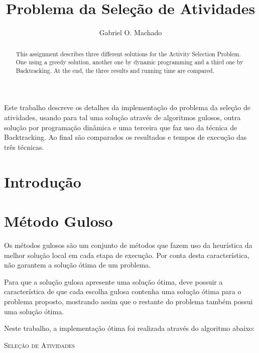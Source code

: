 \documentclass[12pt]{article}
\title{Problema da Seleção de Atividades}
\author{Gabriel O. Machado\inst{1} }
\begin{document}
 

\maketitle

\begin{abstract}
	This assignment describes three different solutions for the Activity Selection Problem. One using a greedy solution, 
	another one by dynamic programming and a third one by Backtracking.
	At the end, the three results and running time are compared.
\end{abstract}
     
\begin{resumo} 
	Este trabalho descreve os detalhes da implementação do problema da seleção de atividades, 
	usando para tal uma solução através de algoritmos gulosos, outra solução por programação dinâmica
	e uma terceira que faz uso da técnica de Backtracking.
	Ao final são comparados os resultados e tempos de execução das três técnicas.
	
\end{resumo}


\section{Introdução}



\section{Método Guloso} \label{sec:guloso}

Os métodos gulosos são um conjunto de métodos que fazem uso da heurística da melhor solução local em cada etapa de execução. Por conta desta característica, não garantem a solução ótima de um problema.

Para que a solução gulosa apresente uma solução ótima, deve possuir a característica de que cada escolha gulosa contenha uma solução ótima para o problema proposto, mostrando assim que o restante do problema também possui uma solução ótima.

Neste trabalho, a implementação ótima foi realizada através do algoritmo abaixo:

 \begin{algorithm}[H]
   \SetAlgoLined
   \label{alg1}
   \caption{\textsc{Seleção de Atividades}}
 \end{algorithm}
\end{document}
